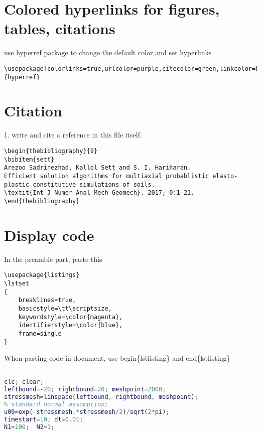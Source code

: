 \documentclass[12pt]{article}
\begin{document}
\section{Colored hyperlinks for figures, tables, citations}
use hyperref package to change the default color and set hyperlinks
\begin{lstlisting}
\usepackage[colorlinks=true,urlcolor=purple,citecolor=green,linkcolor=blue]{hyperref}
\end{lstlisting}


\section{Citation}

1. write and cite a reference in this file itself. \cite{sett}
\begin{lstlisting}
\begin{thebibliography}{9}
\bibitem{sett} 
Arezoo Sadrinezhad, Kallol Sett and S. I. Hariharan. 
Efficient solution algorithms for multiaxial probablistic elasto-plastic constitutive simulations of soils.
\textit{Int J Numer Anal Mech Geomech}. 2017; 0:1-21.
\end{thebibliography}
\end{lstlisting}


\section{Display code}
In the preamble part, paste this
\begin{lstlisting}
\usepackage{listings}
\lstset
{
    breaklines=true,
    basicstyle=\tt\scriptsize,
    keywordstyle=\color{magenta},
    identifierstyle=\color{blue},
    frame=single
}
\end{lstlisting}

When pasting code in document, use begin\{lstlisting\} and end\{lstlisting\}

\begin{lstlisting}[language=Matlab]

clc; clear;
leftbound=-20; rightbound=20; meshpoint=2000;
stressmesh=linspace(leftbound, rightbound, meshpoint);
% standard normal assumption;
u00=exp(-stressmesh.*stressmesh/2)/sqrt(2*pi); 
timestart=10; dt=0.01;
N1=100;  N2=1;        

\end{lstlisting}
\end{document}
